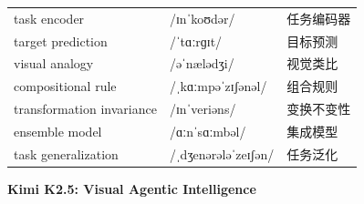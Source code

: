 \documentclass[UTF8,12pt,a4paper]{ctexart}
\providecommand{\zh}[1]{#1}
\begin{document}
\begin{tabular*}{\textwidth}{@{\extracolsep{\fill}}lll@{}}
task encoder & {\ipafont /ɪnˈkoʊdər/} & \zh{任务编码器} \\
target prediction & {\ipafont /ˈtɑːrɡɪt/} & \zh{目标预测} \\
visual analogy & {\ipafont /əˈnælədʒi/} & \zh{视觉类比} \\
compositional rule & {\ipafont /ˌkɑːmpəˈzɪʃənəl/} & \zh{组合规则} \\
transformation invariance & {\ipafont /ɪnˈveriəns/} & \zh{变换不变性} \\
ensemble model & {\ipafont /ɑːnˈsɑːmbəl/} & \zh{集成模型} \\
task generalization & {\ipafont /ˌdʒenərələˈzeɪʃən/} & \zh{任务泛化} \\
\bottomrule
\end{tabular*}

\newpage

\begin{center}
    {\Large\bfseries Kimi K2.5: Visual Agentic Intelligence}
\end{center}
\end{document}
